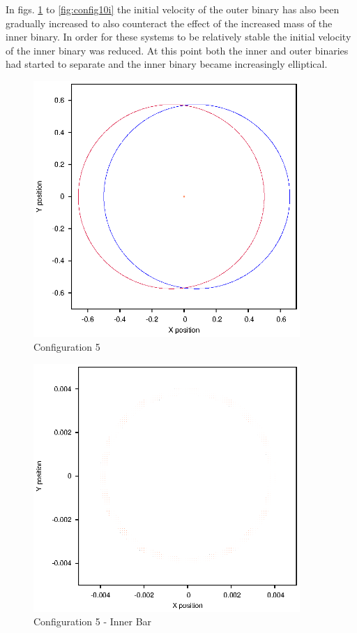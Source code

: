 \documentclass[a4paper,12pt]{article}
\begin{document}
In figs. \ref{fig:config5} to \ref{fig:config10i} the initial velocity of the outer binary has also been gradually increased to also counteract the effect
of the increased mass of the inner binary. In order for these systems to be relatively stable the initial velocity of the inner binary was reduced. At this point 
both the inner and outer binaries had started to separate and the inner binary became increasingly elliptical.
\begin{figure}[H]
\centering
\includegraphics[width=0.9\textwidth]{./2016results/004-55-004/Orbit.eps}
\caption{Configuration 5}
\label{fig:config5}
\end{figure}
\begin{figure}[H]
\centering
\includegraphics[width=0.9\textwidth]{./2016results/004-55-004/Inner.eps}
\caption{Configuration 5 - Inner Bar}
\label{fig:config5i}
\end{figure}
\end{document}
